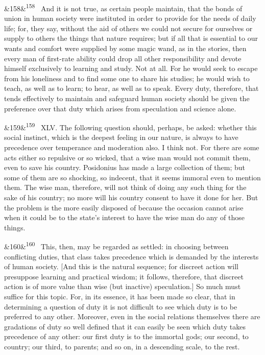\documentclass[12pt]{article}
\newcommand{\para}[1][]{\par\noindent\ifx&#1&\else\textsuperscript{\footnotesize #1}~\fi}
\begin{document}
\para[158] And it is not true, as certain people maintain, that the bonds of union in human society were instituted in order to provide for the needs of daily life; for, they say, without the aid of others we could not secure for ourselves or supply to others the things that nature requires; but if all that is essential to our wants and comfort were supplied by some magic wand, as in the stories, then every man of first-rate ability could drop all other responsibility and devote himself exclusively to learning and study. Not at all. For he would seek to escape from his loneliness and to find some one to share his studies; he would wish to teach, as well as to learn; to hear, as well as to speak. Every duty, therefore, that tends effectively to maintain and safeguard human society should be given the preference over that duty which arises from speculation and science alone.

\para[159] XLV. The following question should, perhaps, be asked: whether this social instinct, which is the deepest feeling in our nature, is always to have precedence over temperance and moderation also. I think not. For there are some acts either so repulsive or so wicked, that a wise man would not commit them, even to save his country. Posidonius has made a large collection of them; but some of them are so shocking, so indecent, that it seems immoral even to mention them. The wise man, therefore, will not think of doing any such thing for the sake of his country; no more will his country consent to have it done for her. But the problem is the more easily disposed of because the occasion cannot arise when it could be to the state's interest to have the wise man do any of those things.

\para[160] This, then, may be regarded as settled: in choosing between conflicting duties, that class takes precedence which is demanded by the interests of human society. [And this is the natural sequence; for discreet action will presuppose learning and practical wisdom; it follows, therefore, that discreet action is of more value than wise (but inactive) speculation.] So much must suffice for this topic. For, in its essence, it has been made so clear, that in determining a question of duty it is not difficult to see which duty is to be preferred to any other. Moreover, even in the social relations themselves there are gradations of duty so well defined that it can easily be seen which duty takes precedence of any other: our first duty is to the immortal gods; our second, to country; our third, to parents; and so on, in a descending scale, to the rest.
\end{document}
